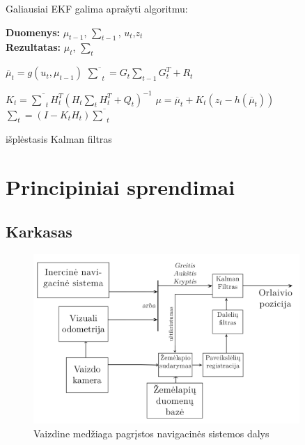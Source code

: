 \documentclass[a4paper,12pt]{article}
\renewcommand{\KwData}{\textbf{Duomenys:}}
\renewcommand{\KwResult}{\textbf{Rezultatas:}}
\begin{document}
		Galiausiai EKF galima aprašyti algoritmu:
		\begin{algorithm}[h]
			\label{alg:EKF}
			\SetNlSty{}{}{:}
			\LinesNumbered
			
			\KwData{ $\mu_{t-1}$, $\sum_{t-1} $, $u_t$,$z_t$ \\}
			\KwResult{ $\mu_t$, $\sum_{t}$\\}		
			
			$\overline{\mu}_{t} = g(u_t,\mu_{t-1})$\;
			$\overline{\sum}_{t} = G_t \sum_{t-1}G_t^T+R_t$\;
			
			$K_t = \overline{\sum}_{t} H_t^T \left(H_t\sum_{t}H_t^T + Q_t \right)^{-1}$ \;
			$\mu = \overline{\mu}_{t} + K_t(z_t-h(\overline{\mu}_{t}))$	\;
			$\sum_t = (I - K_tH_t)\overline{\sum}_{t}$\;
			\caption{išplėstasis Kalman filtras}
		\end{algorithm} 
			
	\section{Principiniai sprendimai}
		\subsection{Karkasas}
		
		\begin{figure}[H]
			\includegraphics[width=0.9\textwidth]{images/SystemParts.png}
			\caption{Vaizdine medžiaga pagrįstos navigacinės sistemos dalys}
			\label{fig:SystemParts}
		\end{figure}
		
\end{document}
